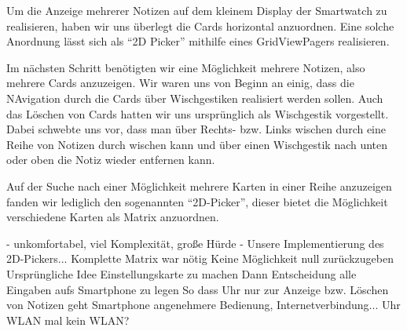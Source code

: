 Um die Anzeige mehrerer Notizen auf dem kleinem Display der Smartwatch zu realisieren, haben wir uns überlegt die Cards horizontal anzuordnen. Eine solche Anordnung lässt sich als "`2D Picker"' mithilfe eines GridViewPagers realisieren. 


Im nächsten Schritt benötigten wir eine Möglichkeit mehrere Notizen, also mehrere Cards anzuzeigen. Wir waren uns von Beginn an einig, dass die NAvigation durch die Cards über Wischgestiken realisiert werden sollen. Auch das Löschen von Cards hatten wir uns ursprünglich als Wischgestik vorgestellt. Dabei schwebte uns vor, dass man über Rechts- bzw. Links wischen durch eine Reihe von Notizen durch wischen kann und über einen Wischgestik nach unten oder oben die Notiz wieder entfernen kann.

Auf der Suche nach einer Möglichkeit mehrere Karten in einer Reihe anzuzeigen fanden wir lediglich den sogenannten "`2D-Picker"', dieser bietet die Möglichkeit verschiedene Karten als Matrix anzuordnen.

	- unkomfortabel, viel Komplexität, große Hürde
	- Unsere Implementierung des 2D-Pickers... 
		Komplette Matrix war nötig
		Keine Möglichkeit null zurückzugeben
		Ursprüngliche Idee Einstellungskarte zu machen
		Dann Entscheidung alle Eingaben aufs Smartphone zu legen
		So dass Uhr nur zur Anzeige bzw. Löschen von Notizen geht
		Smartphone angenehmere Bedienung, Internetverbindung... Uhr WLAN mal kein WLAN?
